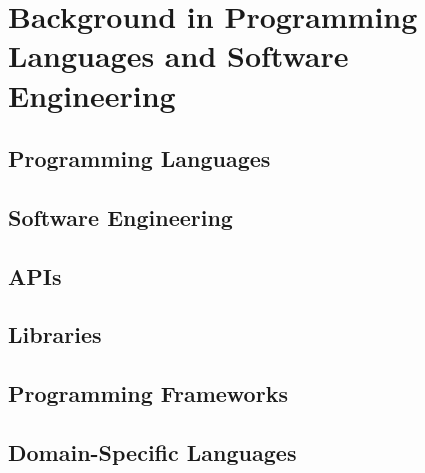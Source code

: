 
\chapter{Background in Programming Languages and Software Engineering}

\section{Programming Languages}

\section{Software Engineering}

\section{APIs}

\section{Libraries}

\section{Programming Frameworks}

\section{Domain-Specific Languages}
